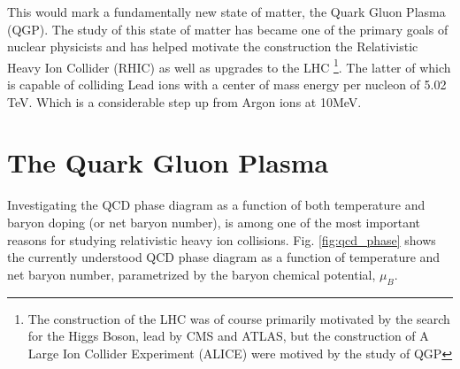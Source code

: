This would mark a fundamentally new state of matter, the Quark Gluon Plasma (QGP). The study of this state of matter has became one of the primary goals of nuclear physicists and has helped motivate the construction the Relativistic Heavy Ion Collider (RHIC) as well as upgrades to the LHC \footnote{The construction of the LHC was of course primarily motivated by the search for the Higgs Boson, lead by CMS and ATLAS, but the construction of A Large Ion Collider Experiment (ALICE) were motived by the study of QGP}. The latter of which is capable of colliding Lead ions with a center of mass energy per nucleon of 5.02 TeV. Which is a considerable step up from Argon ions at 10MeV. 


\section{The Quark Gluon Plasma}\label{sec:QGP}

Investigating the QCD phase diagram as a function of both temperature and baryon doping (or net baryon number), is among one of the most important reasons for studying relativistic heavy ion collisions. Fig. \ref{fig:qcd_phase} shows the currently understood QCD phase diagram as a function of temperature and net baryon number, parametrized by the baryon chemical potential, $\mu_B$.


